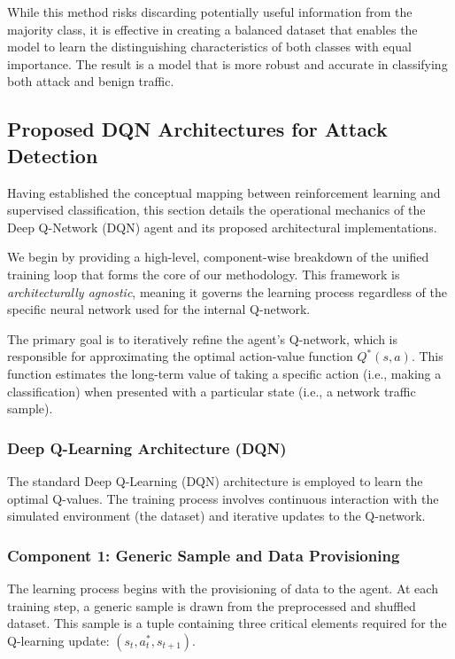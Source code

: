 \documentclass[16pt]{report}
\begin{document}
While this method risks discarding potentially useful information from the majority class, it is effective in creating a balanced dataset that enables the model to learn the distinguishing characteristics of both classes with equal importance. The result is a model that is more robust and accurate in classifying both attack and benign traffic.

\subsection{Proposed DQN Architectures for Attack Detection}

Having established the conceptual mapping between reinforcement learning and supervised classification, this section details the operational mechanics of the Deep Q-Network (DQN) agent and its proposed architectural implementations.

We begin by providing a high-level, component-wise breakdown of the unified training loop that forms the core of our methodology. This framework is \textit{architecturally agnostic}, meaning it governs the learning process regardless of the specific neural network used for the internal Q-network.

The primary goal is to iteratively refine the agent’s Q-network, which is responsible for approximating the optimal action-value function \( Q^*(s, a) \). This function estimates the long-term value of taking a specific action (i.e., making a classification) when presented with a particular state (i.e., a network traffic sample).

\subsubsection{Deep Q-Learning Architecture (DQN)}

The standard Deep Q-Learning (DQN) architecture is employed to learn the optimal Q-values. The training process involves continuous interaction with the simulated environment (the dataset) and iterative updates to the Q-network.

\subsubsection*{Component 1: Generic Sample and Data Provisioning}

The learning process begins with the provisioning of data to the agent. At each training step, a generic sample is drawn from the preprocessed and shuffled dataset. This sample is a tuple containing three critical elements required for the Q-learning update: \( (s_t, a^*_t, s_{t+1}) \).
\end{document}
